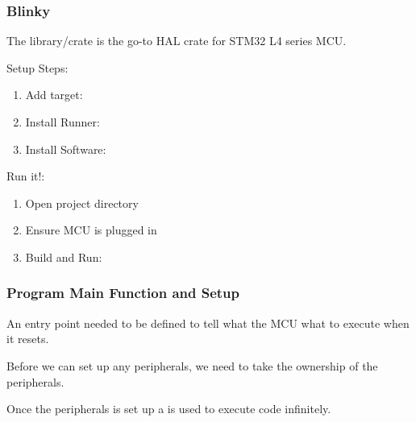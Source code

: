 \documentclass{beamer}
\begin{document}
\begin{frame}
  \frametitle{Blinky}
  The  library/crate is the go-to HAL crate for STM32 L4 series MCU.

  Setup Steps:

  \begin{enumerate}
    \item{Add target: }
    \item{Install Runner: }
    \item{Install Software: }
  \end{enumerate}

  Run it!:

  \begin{enumerate}
    \item{Open project directory}
    \item{Ensure MCU is plugged in}
    \item{Build and Run: }
  \end{enumerate}
\end{frame}

\begin{frame}
  \frametitle{Program Main Function and Setup}
  An entry point needed to be defined to tell what the MCU what to execute when it resets.

  

  Before we can set up any peripherals, we need to take the ownership of the peripherals.

  

  Once the peripherals is set up a  is used to execute code infinitely.
\end{frame}
\end{document}
